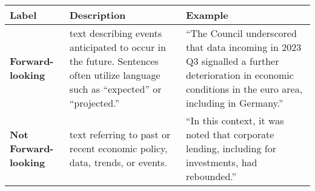 \begin{table*}
    \caption{}
    \vspace{1em}
    
    \begin{tabular}{p{}p{}p{}}
    \toprule
    \textbf{Label} & \textbf{Description} & \textbf{Example}\\
    \midrule
    \textbf{Forward-looking} & text describing events anticipated to occur in the future. Sentences often utilize language such as “expected” or “projected.” & “The Council underscored that data incoming in 2023 Q3 signalled a further deterioration in economic conditions in the euro area, including in Germany.” \\
    \midrule
    \textbf{Not Forward-looking} & text referring to past or recent economic policy, data, trends, or events. & “In this context, it was noted that corporate lending, including for investments, had rebounded.” \\
    \bottomrule
    \end{tabular}
    \label{tb:nbp_forward_looking_guide}
    \end{table*}